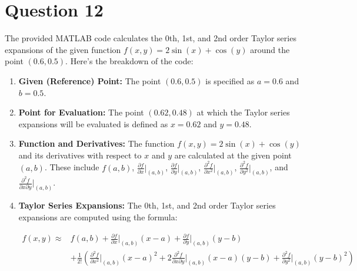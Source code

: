 \section*{Question 12}

The provided MATLAB code calculates the 0th, 1st, and 2nd order Taylor series expansions of the given function \( f(x, y) = 2\sin(x) + \cos(y) \) around the point \( (0.6, 0.5) \). Here's the breakdown of the code:

\begin{enumerate}
    
    \item \textbf{Given (Reference) Point:} The point \( (0.6, 0.5) \) is specified as \( a = 0.6 \) and \( b = 0.5 \).
    
    \item \textbf{Point for Evaluation:} The point \( (0.62, 0.48) \) at which the Taylor series expansions will be evaluated is defined as \( x = 0.62 \) and \( y = 0.48 \).
    
    \item \textbf{Function and Derivatives:} The function \( f(x, y) = 2\sin(x) + \cos(y) \) and its derivatives with respect to \( x \) and \( y \) are calculated at the given point \( (a, b) \). These include \( f(a, b) \), \( \frac{\partial f}{\partial x}\bigg|_{(a, b)} \), \( \frac{\partial f}{\partial y}\bigg|_{(a, b)} \), \( \frac{\partial^2 f}{\partial x^2}\bigg|_{(a, b)} \), \( \frac{\partial^2 f}{\partial y^2}\bigg|_{(a, b)} \), and \( \frac{\partial^2 f}{\partial x \partial y}\bigg|_{(a, b)} \).
    
    \item \textbf{Taylor Series Expansions:} The 0th, 1st, and 2nd order Taylor series expansions are computed using the formula:

    \begin{center}
    \begin{equation*}
    \begin{aligned}
    f(x, y) \approx & f(a, b) + \frac{\partial f}{\partial x}\bigg|_{(a, b)} (x - a) + \frac{\partial f}{\partial y}\bigg|_{(a, b)} (y - b) \\
    & + \frac{1}{2!}\left(\frac{\partial^2 f}{\partial x^2}\bigg|_{(a, b)} (x - a)^2 + 2\frac{\partial^2 f}{\partial x \partial y}\bigg|_{(a, b)} (x - a)(y - b) + \frac{\partial^2 f}{\partial y^2}\bigg|_{(a, b)} (y - b)^2\right)
    \end{aligned}
    \end{equation*}
    \end{center}


\end{enumerate}
